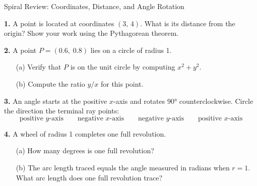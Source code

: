 \documentclass[10pt]{article}
\begin{document}
\namedateperiod

\vspace{0.10in}

\begin{notesbox}{Spiral Review: Coordinates, Distance, and Angle Rotation}

\textbf{1.} A point is located at coordinates $(3,\, 4)$. What is its distance from the origin?
Show your work using the Pythagorean theorem.

\vspace{0.55in}

\textbf{2.} A point $P = (0.6,\; 0.8)$ lies on a circle of radius 1.
\begin{itemize}[leftmargin=1.6em, itemsep=2pt]
  \item[(a)] Verify that $P$ is on the unit circle by computing $x^2 + y^2$. \hfill\blank{2.2cm}
  \item[(b)] Compute the ratio $y/x$ for this point. \hfill\blank{2.2cm}
\end{itemize}

\vspace{0.35in}

\textbf{3.} An angle starts at the positive $x$-axis and rotates $90°$ counterclockwise.
Circle the direction the terminal ray points:
\[
  \text{positive } y\text{-axis} \qquad \text{negative } x\text{-axis} \qquad
  \text{negative } y\text{-axis} \qquad \text{positive } x\text{-axis}
\]

\vspace{0.20in}

\textbf{4.} A wheel of radius 1 completes one full revolution.
\begin{itemize}[leftmargin=1.6em, itemsep=2pt]
  \item[(a)] How many degrees is one full revolution? \hfill\blank{2.2cm}
  \item[(b)] The arc length traced equals the angle measured in radians when $r = 1$.
        What arc length does one full revolution trace? \hfill\blank{2.2cm}
\end{itemize}

\end{notesbox}
\end{document}
